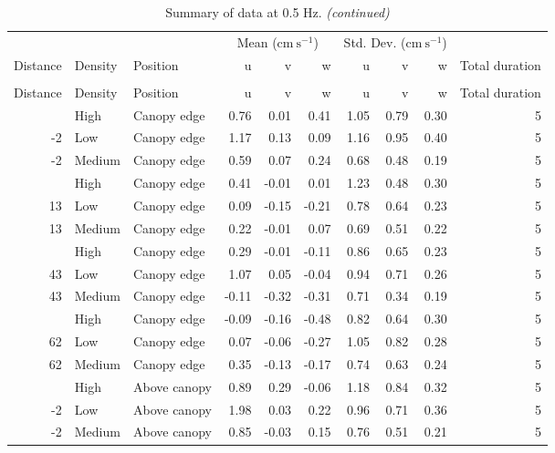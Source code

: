 \documentclass[10pt,]{article}
\begin{document}
\begin{longtable}{rllrrrrrrr}
\caption{\label{tab:unnamed-chunk-2}Summary of data at 0.5 Hz.}\\
\toprule
\multicolumn{3}{c}{ } & \multicolumn{3}{c}{Mean ($\text{cm}~\text{s}^{-1}$)} & \multicolumn{3}{c}{Std. Dev. ($\text{cm}~\text{s}^{-1}$)} \\
\cmidrule(l{2pt}r{2pt}){4-6} \cmidrule(l{2pt}r{2pt}){7-9}
Distance & Density & Position & u & v & w & u & v & w & Total duration\\
\midrule
\endfirsthead
\caption[]{\label{tab:unnamed-chunk-2}Summary of data at 0.5 Hz. \textit{(continued)}}\\
\toprule
Distance & Density & Position & u & v & w & u & v & w & Total duration\\
\midrule
\endhead
\
\endfoot
\bottomrule
\endlastfoot
-2 & High & Canopy edge & 0.76 & 0.01 & 0.41 & 1.05 & 0.79 & 0.30 & 5\\
-2 & Low & Canopy edge & 1.17 & 0.13 & 0.09 & 1.16 & 0.95 & 0.40 & 5\\
-2 & Medium & Canopy edge & 0.59 & 0.07 & 0.24 & 0.68 & 0.48 & 0.19 & 5\\
\addlinespace
13 & High & Canopy edge & 0.41 & -0.01 & 0.01 & 1.23 & 0.48 & 0.30 & 5\\
13 & Low & Canopy edge & 0.09 & -0.15 & -0.21 & 0.78 & 0.64 & 0.23 & 5\\
13 & Medium & Canopy edge & 0.22 & -0.01 & 0.07 & 0.69 & 0.51 & 0.22 & 5\\
\addlinespace
43 & High & Canopy edge & 0.29 & -0.01 & -0.11 & 0.86 & 0.65 & 0.23 & 5\\
43 & Low & Canopy edge & 1.07 & 0.05 & -0.04 & 0.94 & 0.71 & 0.26 & 5\\
43 & Medium & Canopy edge & -0.11 & -0.32 & -0.31 & 0.71 & 0.34 & 0.19 & 5\\
\addlinespace
62 & High & Canopy edge & -0.09 & -0.16 & -0.48 & 0.82 & 0.64 & 0.30 & 5\\
62 & Low & Canopy edge & 0.07 & -0.06 & -0.27 & 1.05 & 0.82 & 0.28 & 5\\
62 & Medium & Canopy edge & 0.35 & -0.13 & -0.17 & 0.74 & 0.63 & 0.24 & 5\\
\addlinespace
-2 & High & Above canopy & 0.89 & 0.29 & -0.06 & 1.18 & 0.84 & 0.32 & 5\\
-2 & Low & Above canopy & 1.98 & 0.03 & 0.22 & 0.96 & 0.71 & 0.36 & 5\\
-2 & Medium & Above canopy & 0.85 & -0.03 & 0.15 & 0.76 & 0.51 & 0.21 & 5\\

\end{longtable}
\end{document}
